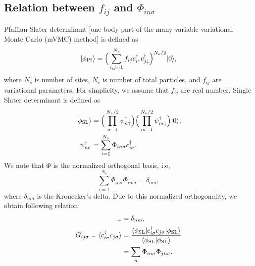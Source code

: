 \subsection{Relation between $f_{ij}$ and $\Phi_{in\sigma}$}
Pfaffian Slater determinant [one-body part of the many-variable variational Monte Carlo (mVMC) method]
is defined as
\begin{equation}
|\phi_{\rm Pf}\rangle=\Big(\sum_{i,j=1}^{N_{s}}f_{ij}c_{i\uparrow}^{\dagger}c_{j\downarrow}^{\dagger}\Big)^{N_{\rm e}/2}|0\rangle,
\end{equation}
where $N_{s}$ is number of sites, 
$N_{e}$ is number of total particles,
and $f_{ij}$ are variational parameters.
For simplicity, we assume that $f_{ij}$ are real number.
Single Slater determinant is defined as 
\begin{align}
|\phi_{\rm SL}\rangle&=\Big(\prod_{n=1}^{N_{e}/2}\psi_{n\uparrow}^{\dagger}\Big)
\Big(\prod_{m=1}^{N_{e}/2}\psi_{m\downarrow}^{\dagger}\Big)|0\rangle, \\
\psi_{n\sigma}^{\dagger}&=\sum_{i=1}^{N_{s}}\Phi_{in\sigma}c^{\dagger}_{i\sigma}.
\end{align}
We note that $\Phi$ is the normalized orthogonal basis, i.e, 
\begin{equation}
\sum_{i=1}^{N_{s}}\Phi_{in\sigma}\Phi_{im\sigma}=\delta_{nm},
\end{equation}
where $\delta_{nm}$ is the Kronecker's delta.
Due to this normalized orthogonality, we obtain 
following relation:
\begin{align}
[\psi^{\dagger}_{n\sigma},\psi_{m\sigma}]_{+}&=\delta_{nm},\\
G_{ij\sigma}=\langle c_{i\sigma}^{\dagger}c_{j\sigma}\rangle 
&=\frac{\langle \phi_{\rm SL}| c_{i\sigma}^{\dagger}c_{j\sigma} | \phi_{\rm SL}\rangle}{\langle \phi_{\rm SL}|\phi_{\rm SL}\rangle } \\
&=\sum_{n} \Phi_{in\sigma} \Phi_{jn\sigma}.
\end{align}

